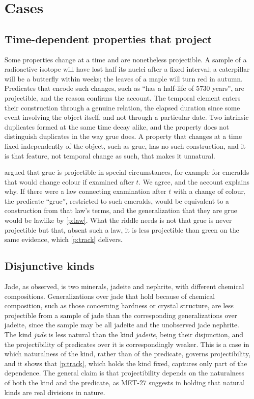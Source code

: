 \documentclass{situationist-preprint}
\begin{document}
\section{Cases}

\subsection{Time-dependent properties that project}

Some properties change at a time and are nonetheless projectible. A sample of a radioactive isotope will have lost half its nuclei after a fixed interval; a caterpillar will be a butterfly within weeks; the leaves of a maple will turn red in autumn. Predicates that encode such changes, such as \enquote{has a half-life of 5730 years}, are projectible, and the reason confirms the account. The temporal element enters their construction through a genuine relation, the elapsed duration since some event involving the object itself, and not through a particular date. Two intrinsic duplicates formed at the same time decay alike, and the property does not distinguish duplicates in the way grue does. A property that changes at a time fixed independently of the object, such as grue, has no such construction, and it is that feature, not temporal change as such, that makes it unnatural.

\citet{Jackson1975} argued that grue is projectible in special circumstances, for example for emeralds that would change colour if examined after $t$. We agree, and the account explains why. If there were a law connecting examination after $t$ with a change of colour, the predicate \enquote{grue}, restricted to such emeralds, would be equivalent to a construction from that law's terms, and the generalization that they are grue would be lawlike by \ref{p:law}. What the riddle needs is not that grue is never projectible but that, absent such a law, it is less projectible than green on the same evidence, which \ref{p:track} delivers.

\subsection{Disjunctive kinds}

Jade, as \citet{Putnam1975} observed, is two minerals, jadeite and nephrite, with different chemical compositions. Generalizations over jade that hold because of chemical composition, such as those concerning hardness or crystal structure, are less projectible from a sample of jade than the corresponding generalizations over jadeite, since the sample may be all jadeite and the unobserved jade nephrite. The kind \emph{jade} is less natural than the kind \emph{jadeite}, being their disjunction, and the projectibility of predicates over it is correspondingly weaker. This is a case in which naturalness of the kind, rather than of the predicate, governs projectibility, and it shows that \ref{p:track}, which holds the kind fixed, captures only part of the dependence. The general claim is that projectibility depends on the naturalness of both the kind and the predicate, as MET-27 suggests in holding that natural kinds are real divisions in nature.
\end{document}

